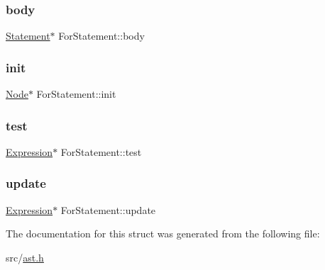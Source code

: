 \subsubsection{\texorpdfstring{body}{body}}
{\footnotesize\ttfamily \hyperlink{struct_statement}{Statement}$\ast$ For\+Statement\+::body}

\mbox{\label{struct_for_statement_aa4516b04bff706f5ad80915357da05e5}} 
\subsubsection{\texorpdfstring{init}{init}}
{\footnotesize\ttfamily \hyperlink{struct_node}{Node}$\ast$ For\+Statement\+::init}

\mbox{\label{struct_for_statement_a97f163e3d73072eccf4b86120ee17efb}} 
\subsubsection{\texorpdfstring{test}{test}}
{\footnotesize\ttfamily \hyperlink{struct_expression}{Expression}$\ast$ For\+Statement\+::test}

\mbox{\label{struct_for_statement_ae0e9d64880b5db76426fdb453275fd90}} 
\subsubsection{\texorpdfstring{update}{update}}
{\footnotesize\ttfamily \hyperlink{struct_expression}{Expression}$\ast$ For\+Statement\+::update}



The documentation for this struct was generated from the following file\+:\begin{DoxyCompactItemize}
\item 
src/\hyperlink{ast_8h}{ast.\+h}\end{DoxyCompactItemize}
